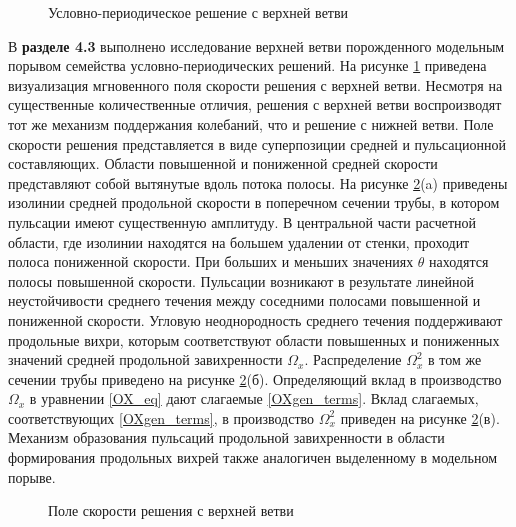 \begin{figure}
\caption{Условно-периодическое решение с верхней ветви}
\label{3D_ub_pic}
\end{figure} 

В \textbf{разделе 4.3} выполнено исследование верхней ветви порожденного модельным порывом семейства условно-периодических решений. На рисунке \ref{3D_ub_pic} приведена визуализация мгновенного поля скорости решения с верхней ветви. Несмотря на существенные количественные отличия, решения с верхней ветви воспроизводят тот же механизм поддержания колебаний, что и решение с нижней ветви. Поле скорости решения представляется в виде суперпозиции средней и пульсационной составляющих. Области повышенной и пониженной средней скорости представляют собой вытянутые вдоль потока полосы. На рисунке \ref{ub_cs_pic}(a) приведены изолинии средней продольной скорости в поперечном сечении трубы, в котором пульсации имеют существенную амплитуду. В центральной части расчетной области, где изолинии находятся на большем удалении от стенки, проходит полоса пониженной скорости. При больших и меньших значениях $\theta$ находятся полосы повышенной скорости. Пульсации возникают в результате линейной неустойчивости среднего течения между соседними полосами повышенной и пониженной скорости. Угловую неоднородность среднего течения поддерживают продольные вихри, которым соответствуют области повышенных и пониженных значений средней продольной завихренности $\Omega_x$. Распределение $\Omega^2_x$ в том же сечении трубы приведено на рисунке \ref{ub_cs_pic}(б). Определяющий вклад в производство $\Omega_x$ в уравнении \eqref{OX_eq} дают слагаемые \eqref{OXgen_terms}. Вклад слагаемых, соответствующих \eqref{OXgen_terms}, в производство $\Omega^2_x$ приведен на рисунке \ref{ub_cs_pic}(в). Механизм образования пульсаций продольной завихренности в области формирования продольных вихрей также аналогичен выделенному в модельном порыве. 


\begin{figure}
\caption{Поле скорости решения с верхней ветви}
\label{ub_cs_pic}
\end{figure} 


